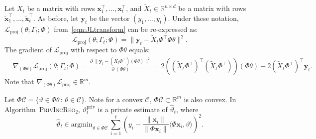 \documentclass{article}
\theoremstyle{plain}
\def \ProjPrivIncReg {\textsc{PrivIncReg$_2$}\xspace}
\def \y {\mathbf y}
\def \CCC {\mathcal{C}}
\def \LLL {\mathcal{L}}
\def \priv {{\mathrm{priv}}}
\def \proj {{\mathrm{proj}}}
\def \x {\mathbf x}
\def \R {\mathbb{R}}
\begin{document}
Let $X_t$ be a matrix with rows $\x_1^\top,\dots,\x_t^\top$, and $\tilde{X}_t \in \R^{n \times d}$ be a matrix with rows $\tilde{\x}_1^\top,\dots,\tilde{\x}_t^\top$. As before, let $\y_t$ be the vector $(y_1,\dots,y_t)$. Under these notation, $\LLL_\proj(\theta;\Gamma_t;\Phi)$ from~\eqref{eqn:JLtransform} can be re-expressed as:
$$\LLL_\proj(\theta;\Gamma_t;\Phi) = \| \y_t - \tilde{X}_t \Phi^\top\Phi \theta\|^2.$$
The gradient of $\LLL_\proj$ with respect to $\Phi \theta$ equals:
\begin{align*}
& \nabla_{(\Phi\theta)} \LLL_\proj(\theta;\Gamma_t;\Phi)  = \frac{\partial \; \| \y_t - (\tilde{X}_t \Phi^\top) (\Phi \theta)\|^2}{\partial \; (\Phi \theta)} =  2((\tilde{X}_t\Phi^\top)^\top (\tilde{X}_t\Phi^\top)) (\Phi \theta) - 2(\tilde{X}_t\Phi^\top)^\top \y_t.
\end{align*}
Note that $\nabla_{(\Phi\theta)} \LLL_\proj \in \R^m$.  

Let $\Phi\CCC = \{ \vartheta \in \Phi\theta \,: \, \theta \in \CCC\}$. Note for a convex $\CCC$, $\Phi\CCC \subset \R^m$ is also convex. In Algorithm~\ProjPrivIncReg, $\vartheta^\priv_t$ is a private estimate of $\hat{\vartheta}_t$, where
$$\hat{\vartheta}_t \in  \mbox{argmin}_{\vartheta \in \Phi\CCC}\,  \sum_{i=1}^t \left (y_i - \frac{\| \x_i \|}{\| \Phi \x_i \|} \langle \Phi \x_i,\vartheta \rangle \right )^2.$$
\end{document}
